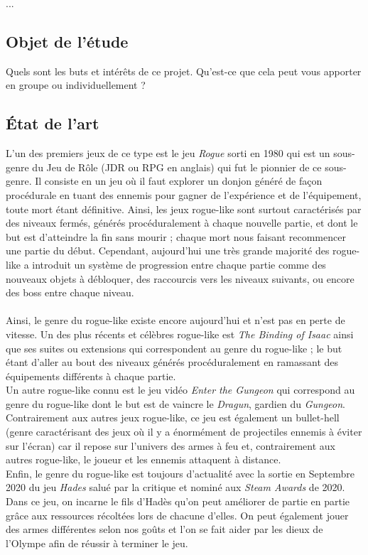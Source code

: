 \documentclass{article}
\begin{document}
...

\subsection{Objet de l'étude}

Quels sont les buts et intérêts de ce projet. Qu’est-ce que cela peut vous apporter en groupe ou individuellement ?

\subsection{État de l'art}

L'un des premiers jeux de ce type est le jeu \textit{Rogue} sorti en 1980 qui est un sous-genre du Jeu de Rôle (JDR ou RPG en anglais) qui fut le pionnier de ce sous-genre. Il consiste en un jeu où il faut explorer un donjon généré de façon procédurale en tuant des ennemis pour gagner de l'expérience et de l'équipement, toute mort étant définitive. Ainsi, les jeux rogue-like sont surtout caractérisés par des niveaux fermés, générés procéduralement à chaque nouvelle partie, et dont le but est d'atteindre la fin sans mourir ; chaque mort nous faisant recommencer une partie du début. Cependant, aujourd'hui une très grande majorité des rogue-like a introduit un système de progression entre chaque partie comme des nouveaux objets à débloquer, des raccourcis vers les niveaux suivants, ou encore des boss entre chaque niveau.\\
\\
Ainsi, le genre du rogue-like existe encore aujourd'hui et n'est pas en perte de vitesse. Un des plus récents et célèbres rogue-like est \textit{The Binding of Isaac} ainsi que ses suites ou extensions qui correspondent au genre du rogue-like ; le but étant d'aller au bout des niveaux générés procéduralement en ramassant des équipements différents à chaque partie.\\
Un autre rogue-like connu est le jeu vidéo \textit{Enter the Gungeon} qui correspond au genre du rogue-like dont le but est de vaincre le \textit{Dragun}, gardien du \textit{Gungeon}. Contrairement aux autres jeux rogue-like, ce jeu est également un bullet-hell (genre caractérisant des jeux où il y a énormément de projectiles ennemis à éviter sur l'écran) car il repose sur l'univers des armes à feu et, contrairement aux autres rogue-like, le joueur et les ennemis attaquent à distance.\\
Enfin, le genre du rogue-like est toujours d'actualité avec la sortie en Septembre 2020 du jeu \textit{Hades} salué par la critique et nominé aux \textit{Steam Awards} de 2020. Dans ce jeu, on incarne le fils d'Hadès qu'on peut améliorer de partie en partie grâce aux ressources récoltées lors de chacune d'elles. On peut également jouer des armes différentes selon nos goûts et l'on se fait aider par les dieux de l'Olympe afin de réussir à terminer le jeu.\\
\end{document}
